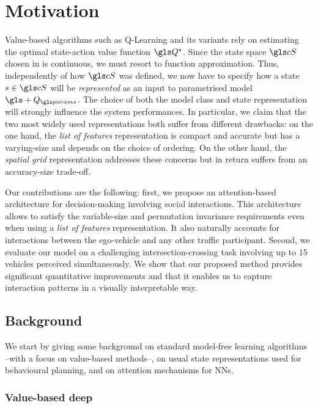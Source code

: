 \section{Motivation}

Value-based  algorithms such as Q-Learning \citep{Watkins1992} and its variants rely on estimating the optimal state-action value function $\Q^\star$. Since the state space $\cS$ chosen in  is continuous, we must resort to function approximation. Thus, independently of how $\cS$ was defined, we now have to specify how a state $s\in\cS$ will be \textit{represented} as an input to parametrised model $\gls+{Q}_\params$. The choice of both the model class and state representation will strongly influence the system performances. In particular, we claim that the two most widely used representations both suffer from different drawbacks: on the one hand, the \emph{list of features} representation is compact and accurate but has a varying-size and depends on the choice of ordering. On the other hand, the \emph{spatial grid} representation addresses these concerns but in return suffers from an accuracy-size trade-off.

Our contributions are the following: first, we propose an attention-based architecture for decision-making involving social interactions. This architecture allows to satisfy the variable-size and permutation invariance requirements even when using a \emph{list of features} representation. It also naturally accounts for interactions between the ego-vehicle and any other traffic participant.
Second, we evaluate our model on a challenging intersection-crossing task involving up to 15 vehicles perceived simultaneously. We show that our proposed method provides significant quantitative improvements and that it enables us to capture interaction patterns in a visually interpretable way.

\subsection{Background}

\label{sec:background}

We start by giving some background on standard model-free learning algorithms --with a focus on value-based methods--, on usual state representations used for behavioural planning, and on attention mechanisms for \glspl{NN}.

\subsubsection{Value-based deep }

